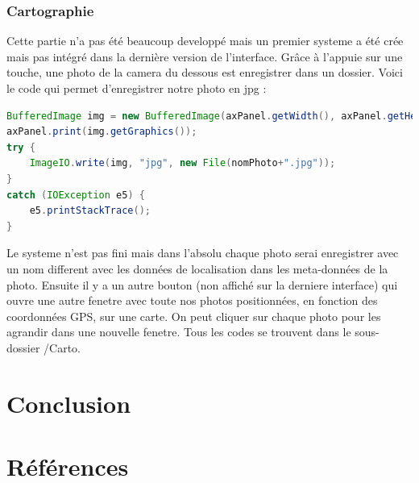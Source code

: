 \documentclass[a4paper,11pt]{report}
\begin{document}
		\subsection{Cartographie}
			\label{subsec:Cartographie}
			Cette partie n'a pas été beaucoup developpé mais un premier systeme a été crée mais pas intégré dans la dernière version de l'interface.
			\newline Grâce à l'appuie sur une touche, une photo de la camera du dessous est enregistrer dans un dossier. Voici le code qui permet d'enregistrer notre photo en jpg :
			\begin{lstlisting}[language=java]
BufferedImage img = new BufferedImage(axPanel.getWidth(), axPanel.getHeight(), BufferedImage.TYPE_INT_RGB);
axPanel.print(img.getGraphics());
try {
	ImageIO.write(img, "jpg", new File(nomPhoto+".jpg"));
}
catch (IOException e5) {
	e5.printStackTrace();
}
		\end{lstlisting}
			Le systeme n'est pas fini mais dans l'absolu chaque photo serai enregistrer avec un nom different avec les données de localisation dans les meta-données de la photo.
			\newline Ensuite il y a un autre bouton (non affiché sur la derniere interface) qui ouvre une autre fenetre avec toute nos photos positionnées, en fonction des coordonnées GPS, sur une carte.
			\newline On peut cliquer sur chaque photo pour les agrandir dans une nouvelle fenetre.
			\newline Tous les codes se trouvent dans le sous-dossier /Carto.
			
\chapter{Conclusion}
			
\chapter{Références}
\end{document}
